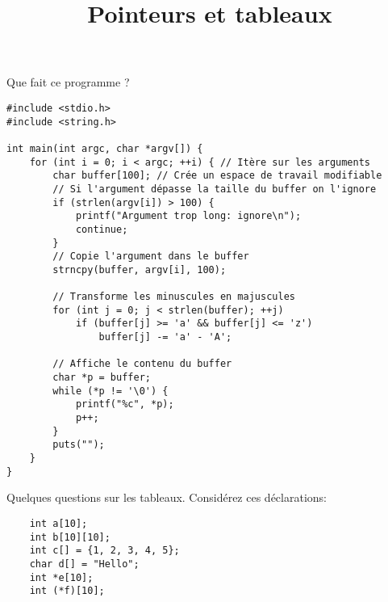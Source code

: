 \documentclass[french,a4paper,addpoints,11pt]{exam}
\title{Pointeurs et tableaux}
\begin{document}
\maketitle
\thispagestyle{headandfoot}

\begin{questions}

\question Que fait ce programme ?



\begin{solution}
\begin{lstlisting}
#include <stdio.h>
#include <string.h>

int main(int argc, char *argv[]) {
    for (int i = 0; i < argc; ++i) { // Itère sur les arguments
        char buffer[100]; // Crée un espace de travail modifiable
        // Si l'argument dépasse la taille du buffer on l'ignore
        if (strlen(argv[i]) > 100) {
            printf("Argument trop long: ignore\n");
            continue;
        }
        // Copie l'argument dans le buffer
        strncpy(buffer, argv[i], 100);

        // Transforme les minuscules en majuscules
        for (int j = 0; j < strlen(buffer); ++j)
            if (buffer[j] >= 'a' && buffer[j] <= 'z')
                buffer[j] -= 'a' - 'A';

        // Affiche le contenu du buffer
        char *p = buffer;
        while (*p != '\0') {
            printf("%c", *p);
            p++;
        }
        puts("");
    }
}
\end{lstlisting}
\end{solution}

\question Quelques questions sur les tableaux. Considérez ces déclarations:

\begin{lstlisting}
    int a[10];
    int b[10][10];
    int c[] = {1, 2, 3, 4, 5};
    char d[] = "Hello";
    int *e[10];
    int (*f)[10];
\end{lstlisting}

\end{questions}
\end{document}
